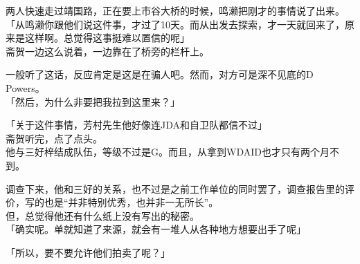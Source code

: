两人快速走过靖国路，正在要上市谷大桥的时候，鸣濑把刚才的事情说了出来。\\

「从鸣濑你跟他们说这件事，才过了10天。而从出发去探索，才一天就回来了，原来是这样啊。总觉得这事挺难以置信的呢」\\

斋贺一边这么说着，一边靠在了桥旁的栏杆上。

一般听了这话，反应肯定是这是在骗人吧。然而，对方可是深不见底的D Powers。\\

「然后，为什么非要把我拉到这里来？」

「关于这件事情，芳村先生他好像连JDA和自卫队都信不过」\\

斋贺听完，点了点头。\\

他与三好梓结成队伍，等级不过是G。而且，从拿到WDAID也才只有两个月不到。

调查下来，他和三好的关系，也不过是之前工作单位的同时罢了，调查报告里的评价，写的也是“并非特别优秀，也并非一无所长”。\\

但，总觉得他还有什么纸上没有写出的秘密。\\

「确实呢。单就知道了来源，就会有一堆人从各种地方想要出手了呢」

「所以，要不要允许他们拍卖了呢？」

